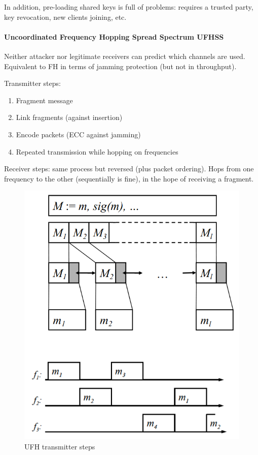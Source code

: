 In addition, pre-loading shared keys is full of problems:
requires a trusted party, key revocation, new clients joining, etc.

\paragraph{Uncoordinated Frequency Hopping Spread Spectrum UFHSS}
Neither attacker nor legitimate receivers can predict which channels are used.
Equivalent to FH in terms of jamming protection (but not in throughput).

Transmitter steps:
\begin{enumerate}
	\item Fragment message
	\item Link fragments (against insertion)
	\item Encode packets (ECC against jamming)
	\item Repeated transmission while hopping on frequencies
\end{enumerate}

Receiver steps: same process but reversed (plus packet ordering).
Hops from one frequency to the other (sequentially is fine), in the hope of receiving a fragment.

\begin{figure}[h]
	\centering
	\includegraphics[scale=0.4]{images/3-ufh.png}
	\caption{UFH transmitter steps}%
	\label{fig:ufh}
\end{figure}

